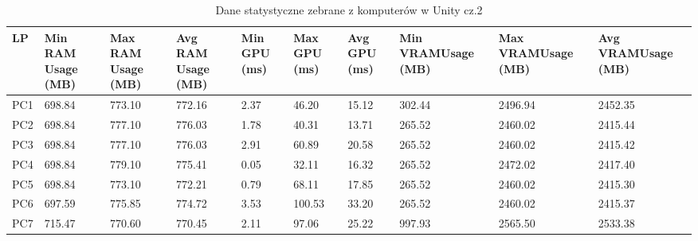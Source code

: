 \documentclass[12pt,twoside]{article}
\begin{document}
\begin{table}[ht]
        \caption{Dane statystyczne zebrane z komputerów w Unity cz.2}
        \centering		
        \begin{tabular}{|p{1cm}|p{}|p{}|p{}|p{1cm}|p{1cm}|p{1cm}|p{}|p{}|p{}|}	
            \hline
            LP & Min RAM Usage (MB) & Max RAM Usage (MB) & Avg RAM Usage (MB) & Min GPU (ms) & Max GPU (ms)  & Avg GPU (ms) & Min VRAMUsage (MB) & Max VRAMUsage (MB) & Avg VRAMUsage (MB) \\
            \hline
            PC1 & 698.84 & 773.10 & 772.16 & 2.37 & 46.20 & 15.12 & 302.44 & 2496.94 & 2452.35 \\
            \hline
            PC2 & 698.84 & 777.10 & 776.03 & 1.78 & 40.31 & 13.71 & 265.52 & 2460.02 & 2415.44 \\
            \hline
            PC3 & 698.84 & 777.10 & 776.03 & 2.91 & 60.89 & 20.58 & 265.52 & 2460.02 & 2415.42 \\
            \hline
            PC4 & 698.84 & 779.10 & 775.41 & 0.05 & 32.11 & 16.32 & 265.52 & 2472.02 & 2417.40 \\
            \hline
            PC5 & 698.84 & 773.10 & 772.21 & 0.79 & 68.11 & 17.85 & 265.52 & 2460.02 & 2415.30 \\
            \hline
            PC6 & 697.59 & 775.85 & 774.72 & 3.53 & 100.53 & 33.20 & 265.52 & 2460.02 & 2415.37 \\
            \hline
            PC7 & 715.47 & 770.60 & 770.45 & 2.11 & 97.06 & 25.22 & 997.93 & 2565.50 & 2533.38 \\
            \hline

            \hline
    
        \end{tabular}	
    \label{Tabela:StatystykiUnity2}
\end{table}	
\newpage
\end{document}
